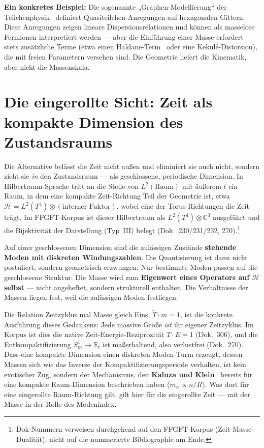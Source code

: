 \documentclass[11pt,a4paper]{article}
\begin{document}
\textbf{Ein konkretes Beispiel:} Die sogenannte „Graphen-Modellierung`` der Teilchenphysik~\cite{Jackiw1999,Sutherland1986} definiert Quasiteilchen-Anregungen auf hexagonalen Gittern. Diese Anregungen zeigen lineare Dispersionsrelationen und können als masselose Fermionen interpretiert werden --- aber die Einführung einer Masse erfordert stets zusätzliche Terme (etwa einen Haldane-Term~\cite{Haldane1988} oder eine Kekulé-Distorsion), die mit freien Parametern versehen sind. Die Geometrie liefert die Kinematik, aber nicht die Massenskala.

\section{Die eingerollte Sicht: Zeit als kompakte Dimension des Zustandsraums}

Die Alternative belässt die Zeit nicht außen und eliminiert sie auch nicht, sondern zieht sie \emph{in} den Zustandsraum --- als geschlossene, periodische Dimension. In Hilbertraum-Sprache tritt an die Stelle von $L^2(\text{Raum})$ mit äußerem $t$ ein Raum, in dem eine kompakte Zeit-Richtung Teil der Geometrie ist, etwa $\mathcal{H} = L^2(T^4)\otimes(\text{interner Faktor})$, wobei eine der Torus-Richtungen die Zeit trägt. Im FFGFT-Korpus ist dieser Hilbertraum als $L^2(T^4)\otimes\mathbb{C}^3$ ausgeführt und die Bijektivität der Darstellung (Typ~III) belegt (Dok.~230/231/232, 270).\footnote{Dok-Nummern verweisen durchgehend auf den FFGFT-Korpus (Zeit-Masse-Dualität), nicht auf die nummerierte Bibliographie am Ende.}

Auf einer geschlossenen Dimension sind die zulässigen Zustände \textbf{stehende Moden mit diskreten Windungszahlen}. Die Quantisierung ist dann nicht postuliert, sondern geometrisch erzwungen: Nur bestimmte Moden passen auf die geschlossene Struktur. Die Masse wird zum \textbf{Eigenwert eines Operators auf $\mathcal{H}$ selbst} --- nicht angeheftet, sondern strukturell enthalten. Die Verhältnisse der Massen liegen fest, weil die zulässigen Moden festliegen.

Die Relation Zeitzyklus mal Masse gleich Eins, $\tilde{T}\cdot m = 1$, ist die konkrete Ausführung dieses Gedankens: Jede massive Größe \emph{ist} ihr eigener Zeitzyklus. Im Korpus ist dies die native Zeit-Energie-Reziprozität $T\cdot E = 1$ (Dok.~306), und die Entkompaktifizierung $S^1_m\to\mathbb{R}_t$ ist maßerhaltend, also verlustfrei (Dok.~270). Dass eine kompakte Dimension einen diskreten Moden-Turm erzeugt, dessen Massen sich wie das Inverse der Kompaktifizierungsperiode verhalten, ist kein exotischer Zug, sondern der Mechanismus, den \textbf{Kaluza und Klein}~\cite{Kaluza1921,Klein1926} bereits für eine kompakte Raum-Dimension beschrieben haben ($m_n \propto n/R$). Was dort für eine eingerollte Raum-Richtung gilt, gilt hier für die eingerollte Zeit --- mit der Masse in der Rolle des Modenindex.
\end{document}
